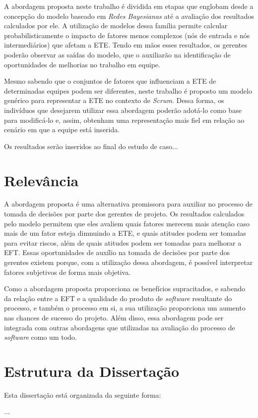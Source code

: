 A abordagem proposta neste trabalho é dividida em etapas que englobam desde a concepção do modelo baseado em \textit{Redes Bayesianas} até a avaliação dos resultados calculados por ele. A utilização de modelos dessa família permite calcular probabilisticamente o impacto de fatores menos complexos (nós de entrada e nós intermediários) que afetam a ETE. Tendo em mãos esses resultados, os gerentes poderão observar as saídas do modelo, que o auxiliarão na identificação de oportunidades de melhorias no trabalho em equipe.

Mesmo sabendo que o conjuntos de fatores que influenciam a ETE de determinadas equipes podem ser diferentes, neste trabalho é proposto um modelo genérico para representar a ETE no contexto de \textit{Scrum}. Dessa forma, os indivíduos que desejarem utilizar essa abordagem poderão adotá-lo como base para modificá-lo e, assim, obtenham uma representação mais fiel em relação ao cenário em que a equipe está inserida.

{\color{red} Os resultados serão inseridos ao final do estudo de caso...}

\section{Relevância}
\label{intro:rel}

A abordagem proposta é uma alternativa promissora para auxiliar no processo de tomada de decisões por parte dos gerentes de projeto. Os resultados calculados pelo modelo permitem que eles avaliem quais fatores merecem mais atenção caso mais de um fator esteja dimnuindo a ETE, e quais atitudes podem ser tomadas para evitar riscos, além de quais atitudes podem ser tomadas para melhorar a EFT. Essas oportunidades de auxílio na tomada de decisões por parte dos gerentes existem porque, com a utilização dessa abordagem, é possível interpretar fatores subjetivos de forma mais objetiva.

Como a abordagem proposta proporciona os benefícios supracitados, e sabendo da relação entre a EFT e a qualidade do produto de \textit{software} resultante do processo, e também o processo em si, a sua utilização proporciona um aumento nas chances de sucesso do projeto. Além disso, essa abordagem pode ser integrada com outras abordagens que utilizadas na avaliação do processo de \textit{software} como um todo.

\section{Estrutura da Dissertação}
\label{intro:estr}

Esta dissertação está organizada da seguinte forma:

...
